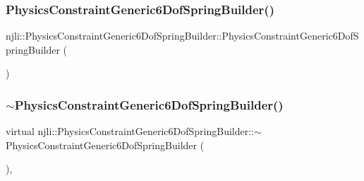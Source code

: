 \subsubsection{\texorpdfstring{Physics\+Constraint\+Generic6\+Dof\+Spring\+Builder()}{PhysicsConstraintGeneric6DofSpringBuilder()}\hspace{0.1cm}{\footnotesize\ttfamily [2/2]}}
{\footnotesize\ttfamily njli\+::\+Physics\+Constraint\+Generic6\+Dof\+Spring\+Builder\+::\+Physics\+Constraint\+Generic6\+Dof\+Spring\+Builder (\begin{DoxyParamCaption}\item[{const \mbox{\hyperlink{classnjli_1_1_physics_constraint_generic6_dof_spring_builder}{Physics\+Constraint\+Generic6\+Dof\+Spring\+Builder}} \&}]{ }\end{DoxyParamCaption})\hspace{0.3cm}{\ttfamily [protected]}}

\mbox{\label{classnjli_1_1_physics_constraint_generic6_dof_spring_builder_a98e6112cbfbba4cd17395630514d0469}} 
\subsubsection{\texorpdfstring{$\sim$\+Physics\+Constraint\+Generic6\+Dof\+Spring\+Builder()}{~PhysicsConstraintGeneric6DofSpringBuilder()}}
{\footnotesize\ttfamily virtual njli\+::\+Physics\+Constraint\+Generic6\+Dof\+Spring\+Builder\+::$\sim$\+Physics\+Constraint\+Generic6\+Dof\+Spring\+Builder (\begin{DoxyParamCaption}{ }\end{DoxyParamCaption})\hspace{0.3cm}{\ttfamily [protected]}, {\ttfamily [virtual]}}



